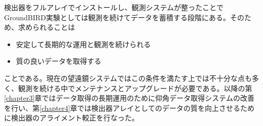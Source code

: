 検出器をフルアレイでインストールし、観測システムが整ったことでGroundBIRD実験としては観測を続けてデータを蓄積する段階にある。そのため、求められることは
\begin{itemize}
  \item 安定して長期的な運用と観測を続けられる
  \item 質の良いデータを取得する
\end{itemize}
ことである。現在の望遠鏡システムではこの条件を満たす上では不十分な点も多く、観測を続ける中でメンテナンスとアップグレードが必要である。以降の第\ref{chapter3}章ではデータ取得の長期運用のために仰角データ取得システムの改善を行い、第\ref{chapter4}章では検出器アレイとしてのデータの質を向上させるために検出器のアライメント較正を行なった。

